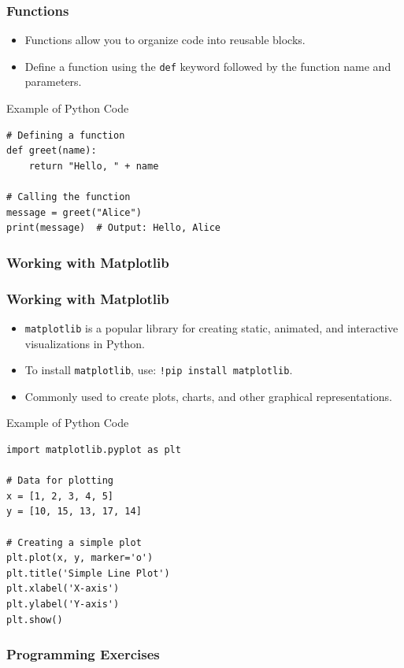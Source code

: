 \documentclass{beamer}
\begin{document}
\begin{frame}[fragile]
\frametitle{Functions}
\begin{itemize}
    \item Functions allow you to organize code into reusable blocks.
    \item Define a function using the \texttt{def} keyword followed by the function name and parameters.
\end{itemize}
\tiny{
\begin{block}{Example of Python Code}
\begin{verbatim}
# Defining a function
def greet(name):
    return "Hello, " + name

# Calling the function
message = greet("Alice")
print(message)  # Output: Hello, Alice
\end{verbatim}
\end{block}}
\end{frame}

\subsubsection*{Working with Matplotlib}

\begin{frame}[fragile]
\frametitle{Working with Matplotlib}
\begin{itemize}
    \item \texttt{matplotlib} is a popular library for creating static, animated, and interactive visualizations in Python.
    \item To install \texttt{matplotlib}, use: \texttt{!pip install matplotlib}.
    \item Commonly used to create plots, charts, and other graphical representations.
\end{itemize}
\tiny{
\begin{block}{Example of Python Code}
\begin{verbatim}
import matplotlib.pyplot as plt

# Data for plotting
x = [1, 2, 3, 4, 5]
y = [10, 15, 13, 17, 14]

# Creating a simple plot
plt.plot(x, y, marker='o')
plt.title('Simple Line Plot')
plt.xlabel('X-axis')
plt.ylabel('Y-axis')
plt.show()
\end{verbatim}
\end{block}}
\end{frame}

\subsubsection*{Programming Exercises}
\end{document}
